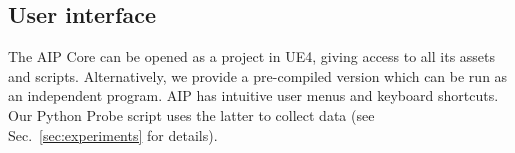 \documentclass[runningheads]{llncs}
\begin{document}
\subsection{User interface}
The AIP Core can be opened as a project in UE4, giving access to all its assets and scripts. Alternatively, we provide a pre-compiled version which can be run as an independent program. AIP has intuitive user menus and keyboard shortcuts. Our Python Probe script uses the latter to collect data (see Sec.~\ref{sec:experiments} for details). 

\vspace{-2em}
\begin{table}[h]
\centering
\caption{Scenarios used in experiments}
\label{tab:scenarios}
\end{table}
\end{document}
